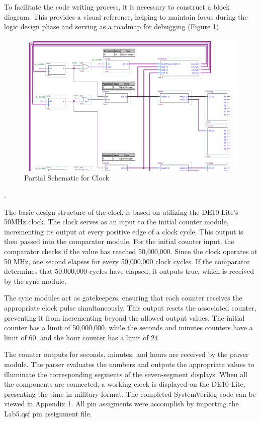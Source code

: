 \documentclass{article}
\begin{document}
To facilitate the code writing process, it is necessary to construct a block diagram. This provides a visual reference, helping to maintain focus during the logic design phase and serving as a roadmap for debugging (Figure 1).

\begin{figure}[H]
  \centering
  \includegraphics[width=1\linewidth]{png/lab5_block.png}
  \caption{Partial Schematic for Clock}  
\end{figure}.

The basic design structure of the clock is based on utilizing the DE10-Lite's 50MHz clock. The clock serves as an input to the initial counter module, incrementing its output at every positive edge of a clock cycle. This output is then passed into the comparator module. For the initial counter input, the comparator checks if the value has reached 50,000,000. Since the clock operates at 50 MHz, one second elapses for every 50,000,000 clock cycles. If the comparator determines that 50,000,000 cycles have elapsed, it outputs true, which is received by the sync module.

The sync modules act as gatekeepers, ensuring that each counter receives the appropriate clock pulse simultaneously. This output resets the associated counter, preventing it from incrementing beyond the allowed output values. The initial counter has a limit of 50,000,000, while the seconds and minutes counters have a limit of 60, and the hour counter has a limit of 24.

The counter outputs for seconds, minutes, and hours are received by the parser module. The parser evaluates the numbers and outputs the appropriate values to illuminate the corresponding segments of the seven-segment displays. When all the components are connected, a working clock is displayed on the DE10-Lite, presenting the time in military format. The completed SystemVerilog code can be viewed in Appendix 1. All pin assigments were accomplish by importing the Lab5.qsf pin assignment file.
\end{document}
